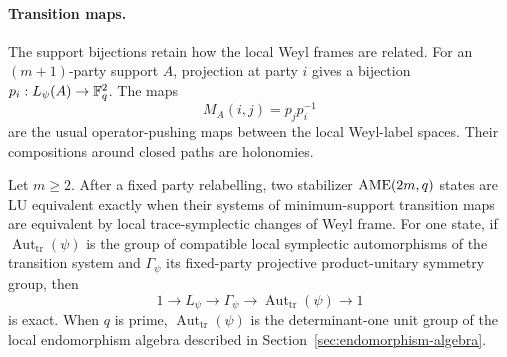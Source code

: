 \paragraph{Transition maps.}

The support bijections retain how the local Weyl frames are related.  For an
\((m+1)\)-party support \(A\), projection at party \(i\) gives a bijection
\(p_i:L_\psi(A)\to\mathbb F_q^2\).  The maps
\[
 M_A(i,j)=p_jp_i^{-1}
\]
are the usual operator-pushing maps between the local Weyl-label spaces.
Their compositions around closed paths are holonomies.

\begin{theorem}
\label{thm:atlas-classification}
Let \(m\geq2\).  After a fixed party relabelling, two stabilizer
\(\mathrm{AME}(2m,q)\) states are LU equivalent exactly when their systems of
minimum-support transition maps
are equivalent by local trace-symplectic changes of Weyl frame.  For one
state, if \(\operatorname{Aut}_{\mathrm{tr}}(\psi)\) is the group of
compatible local symplectic automorphisms of the transition system and
\(\Gamma_\psi\) its fixed-party projective
product-unitary symmetry group, then
\[
 1\longrightarrow L_\psi\longrightarrow\Gamma_\psi
  \longrightarrow\operatorname{Aut}_{\mathrm{tr}}(\psi)\longrightarrow1
\]
is exact.  When \(q\) is prime, \(\operatorname{Aut}_{\mathrm{tr}}(\psi)\)
is the determinant-one unit group of the local endomorphism algebra described
in Section~\ref{sec:endomorphism-algebra}.
\end{theorem}


